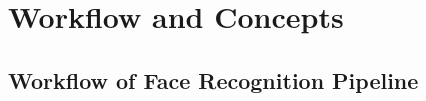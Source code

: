
\section{Workflow and Concepts}

\subsection{Workflow of Face Recognition Pipeline}
\begin{figure}[htbp]
    \centering
    \caption{}
    \label{}
  \end{figure}


